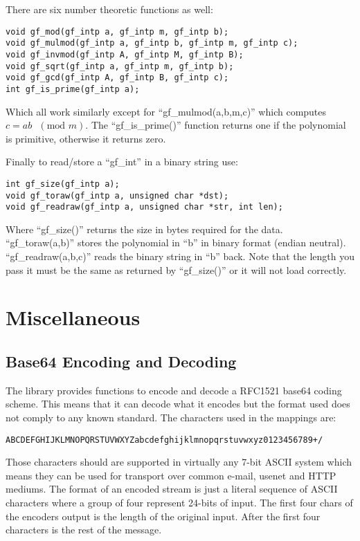 \documentclass{book}
\begin{document}
There are six number theoretic functions as well:
     
\begin{verbatim}
void gf_mod(gf_intp a, gf_intp m, gf_intp b);
void gf_mulmod(gf_intp a, gf_intp b, gf_intp m, gf_intp c);
void gf_invmod(gf_intp A, gf_intp M, gf_intp B);
void gf_sqrt(gf_intp a, gf_intp m, gf_intp b);
void gf_gcd(gf_intp A, gf_intp B, gf_intp c);
int gf_is_prime(gf_intp a);
\end{verbatim}

Which all work similarly except for  ``gf\_mulmod(a,b,m,c)'' which computes $c = ab\mbox{ }(\mbox{mod }m)$.  The 
``gf\_is\_prime()'' function returns one if the polynomial is primitive, otherwise it returns zero.

Finally to read/store a ``gf\_int'' in a binary string use:
   
\begin{verbatim}
int gf_size(gf_intp a);
void gf_toraw(gf_intp a, unsigned char *dst);
void gf_readraw(gf_intp a, unsigned char *str, int len);
\end{verbatim}
Where ``gf\_size()'' returns the size in bytes required for the data.  ``gf\_toraw(a,b)'' stores the polynomial in ``b''
in binary format (endian neutral).  ``gf\_readraw(a,b,c)'' reads the binary string in ``b'' back.  Note that the length 
you pass it must be the same as returned by ``gf\_size()'' or it will not load correctly.

\chapter{Miscellaneous}
\section{Base64 Encoding and Decoding}
The library provides functions to encode and decode a RFC1521 base64 coding scheme.  This means that it can decode what it 
encodes but the format used does not comply to any known standard.  The characters used in the mappings are:
\begin{verbatim}
ABCDEFGHIJKLMNOPQRSTUVWXYZabcdefghijklmnopqrstuvwxyz0123456789+/
\end{verbatim}
Those characters should are supported in virtually any 7-bit ASCII system which means they can be used for transport over
common e-mail, usenet and HTTP mediums.  The format of an encoded stream is just a literal sequence of ASCII characters
where a group of four represent 24-bits of input.  The first four chars of the encoders output is the length of the 
original input.  After the first four characters is the rest of the message.
\end{document}
